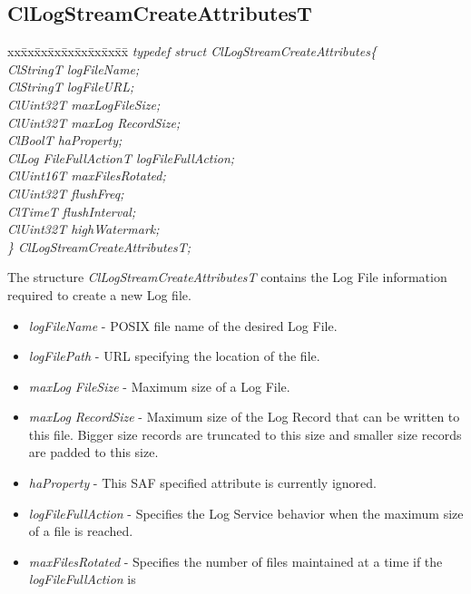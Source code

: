 \begin{flushleft}
\begin{itemize}
\subsection{ClLogStreamCreateAttributesT}
\begin{tabbing}
xx\=xx\=xx\=xx\=xx\=xx\=xx\=xx\=xx\=\kill
\textit{typedef struct ClLogStreamCreateAttributes\{}\\
\>\>\>\>\textit{ClStringT                       logFileName;}\\
\>\>\>\>\textit{ClStringT                       logFileURL;}\\
\>\>\>\>\textit{ClUint32T                      maxLogFileSize;}\\
\>\>\>\>\textit{ClUint32T                      maxLog RecordSize;}\\
\>\>\>\>\textit{ClBoolT                          haProperty;}\\
\>\>\>\>\textit{ClLog FileFullActionT    logFileFullAction;}\\
\>\>\>\>\textit{ClUint16T                       maxFilesRotated;}\\
\>\>\>\>\textit{ClUint32T                       flushFreq;}\\
\>\>\>\>\textit{ClTimeT                          flushInterval;}\\
\>\>\>\>\textit{ClUint32T                       highWatermark;}\\
\textit{\} ClLogStreamCreateAttributesT;}\end{tabbing}
The structure \textit{ClLogStreamCreateAttributesT} contains the Log File information required to create a new Log file.
\begin{itemize}
\item \textit{logFileName} - POSIX file name of the desired Log File.
\item \textit{logFilePath} - URL specifying the location of the file.
\item	\textit{maxLog FileSize} - Maximum size of a Log File.
\item \textit{maxLog RecordSize} - Maximum size of the Log Record that can be written to this file. Bigger size records are truncated 
to this size and smaller size records are padded to this size.
\item \textit{haProperty} - This SAF specified attribute is currently ignored.
\item	\textit{logFileFullAction} - Specifies the Log Service behavior when the maximum size of a file is reached.
\item \textit{maxFilesRotated} - Specifies the number of files maintained at a time if the \textit{logFileFullAction} is 

\end{itemize}
\end{itemize}
\end{flushleft}
